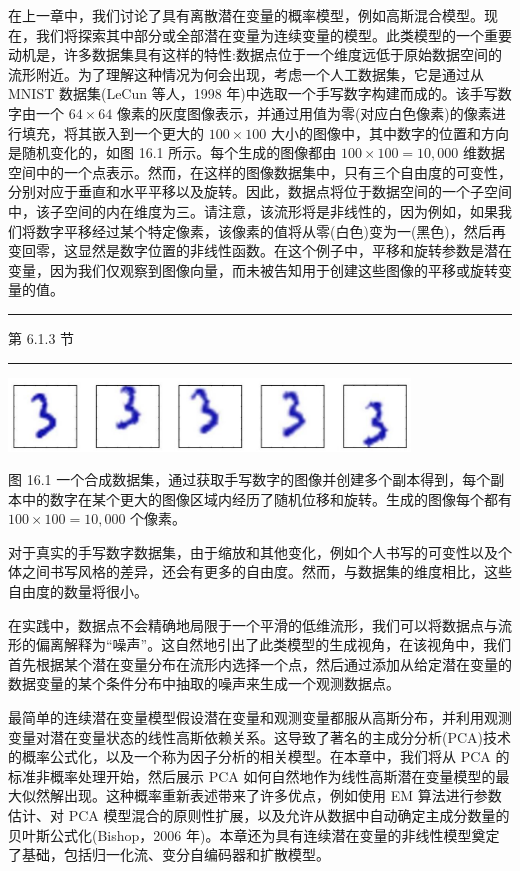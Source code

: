 \documentclass[10pt]{report}
\newcommand{\HRule}{\begin{center}\rule{0.9\linewidth}{0.2mm}\end{center}}
\begin{document}
在上一章中，我们讨论了具有离散潜在变量的概率模型，例如高斯混合模型。现在，我们将探索其中部分或全部潜在变量为连续变量的模型。此类模型的一个重要动机是，许多数据集具有这样的特性:数据点位于一个维度远低于原始数据空间的流形附近。为了理解这种情况为何会出现，考虑一个人工数据集，它是通过从 MNIST 数据集(LeCun 等人，1998 年)中选取一个手写数字构建而成的。该手写数字由一个 \({64} \times  {64}\) 像素的灰度图像表示，并通过用值为零(对应白色像素)的像素进行填充，将其嵌入到一个更大的 \({100} \times  {100}\) 大小的图像中，其中数字的位置和方向是随机变化的，如图 16.1 所示。每个生成的图像都由 \({100} \times  {100} = {10},{000}\) 维数据空间中的一个点表示。然而，在这样的图像数据集中，只有三个自由度的可变性，分别对应于垂直和水平平移以及旋转。因此，数据点将位于数据空间的一个子空间中，该子空间的内在维度为三。请注意，该流形将是非线性的，因为例如，如果我们将数字平移经过某个特定像素，该像素的值将从零(白色)变为一(黑色)，然后再变回零，这显然是数字位置的非线性函数。在这个例子中，平移和旋转参数是潜在变量，因为我们仅观察到图像向量，而未被告知用于创建这些图像的平移或旋转变量的值。

\HRule

第 6.1.3 节

\HRule

\begin{center}
\includegraphics[max width=0.8\textwidth]{images/0194e279-9b28-703a-88f4-c3ac21e2010d_515_409_363_1026_189_0.jpg}
\end{center}
\hspace*{3em} 

图 16.1 一个合成数据集，通过获取手写数字的图像并创建多个副本得到，每个副本中的数字在某个更大的图像区域内经历了随机位移和旋转。生成的图像每个都有 \({100} \times  {100} = {10},{000}\) 个像素。

对于真实的手写数字数据集，由于缩放和其他变化，例如个人书写的可变性以及个体之间书写风格的差异，还会有更多的自由度。然而，与数据集的维度相比，这些自由度的数量将很小。

在实践中，数据点不会精确地局限于一个平滑的低维流形，我们可以将数据点与流形的偏离解释为“噪声”。这自然地引出了此类模型的生成视角，在该视角中，我们首先根据某个潜在变量分布在流形内选择一个点，然后通过添加从给定潜在变量的数据变量的某个条件分布中抽取的噪声来生成一个观测数据点。

最简单的连续潜在变量模型假设潜在变量和观测变量都服从高斯分布，并利用观测变量对潜在变量状态的线性高斯依赖关系。这导致了著名的主成分分析(PCA)技术的概率公式化，以及一个称为因子分析的相关模型。在本章中，我们将从 PCA 的标准非概率处理开始，然后展示 PCA 如何自然地作为线性高斯潜在变量模型的最大似然解出现。这种概率重新表述带来了许多优点，例如使用 EM 算法进行参数估计、对 PCA 模型混合的原则性扩展，以及允许从数据中自动确定主成分数量的贝叶斯公式化(Bishop，2006 年)。本章还为具有连续潜在变量的非线性模型奠定了基础，包括归一化流、变分自编码器和扩散模型。
\end{document}
